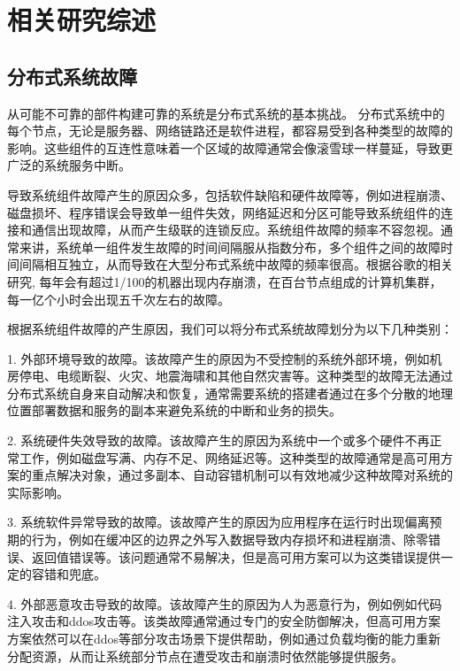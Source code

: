 
\chapter{相关研究综述}

\section{分布式系统故障}

从可能不可靠的部件构建可靠的系统是分布式系统的基本挑战。
分布式系统中的每个节点，无论是服务器、网络链路还是软件进程，都容易受到各种类型的故障的影响。这些组件的互连性意味着一个区域的故障通常会像滚雪球一样蔓延，导致更广泛的系统服务中断。

导致系统组件故障产生的原因众多，包括软件缺陷和硬件故障等，例如进程崩溃、磁盘损坏、程序错误会导致单一组件失效，网络延迟和分区可能导致系统组件的连接和通信出现故障，从而产生级联的连锁反应。系统组件故障的频率不容忽视。通常来讲，系统单一组件发生故障的时间间隔服从指数分布，多个组件之间的故障时间间隔相互独立，从而导致在大型分布式系统中故障的频率很高。根据谷歌的相关研究\cite{beyer2016site}, 每年会有超过1/100的机器出现内存崩溃，在百台节点组成的计算机集群，每一亿个小时会出现五千次左右的故障。

根据系统组件故障的产生原因，我们可以将分布式系统故障划分为以下几种类别\cite{michaud20062}：

1. 外部环境导致的故障。该故障产生的原因为不受控制的系统外部环境，例如机房停电、电缆断裂、火灾、地震海啸和其他自然灾害等。这种类型的故障无法通过分布式系统自身来自动解决和恢复，通常需要系统的搭建者通过在多个分散的地理位置部署数据和服务的副本来避免系统的中断和业务的损失。

2. 系统硬件失效导致的故障。该故障产生的原因为系统中一个或多个硬件不再正常工作，例如磁盘写满、内存不足、网络延迟等。这种类型的故障通常是高可用方案的重点解决对象，通过多副本、自动容错机制可以有效地减少这种故障对系统的实际影响。

3. 系统软件异常导致的故障。该故障产生的原因为应用程序在运行时出现偏离预期的行为，例如在缓冲区的边界之外写入数据导致内存损坏和进程崩溃、除零错误、返回值错误等。该问题通常不易解决，但是高可用方案可以为这类错误提供一定的容错和兜底。

4. 外部恶意攻击导致的故障。该故障产生的原因为人为恶意行为，例如例如代码注入攻击和ddos攻击等。该类故障通常通过专门的安全防御解决，但高可用方案方案依然可以在ddos等部分攻击场景下提供帮助，例如通过负载均衡的能力重新分配资源，从而让系统部分节点在遭受攻击和崩溃时依然能够提供服务。

